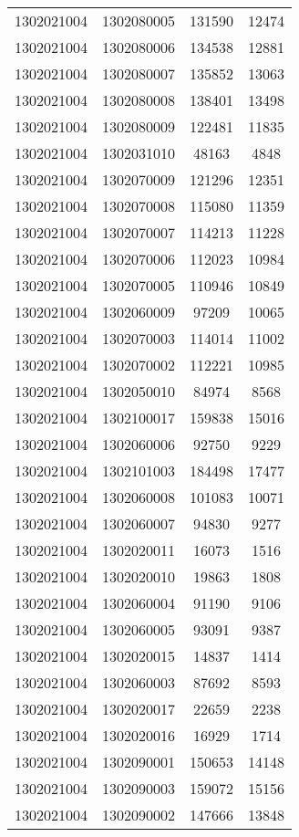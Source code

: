 \begin{longtable}[h]{llcc}
		1302021004 & 1302080005 & 131590 & 12474\\
		1302021004 & 1302080006 & 134538 & 12881\\
		1302021004 & 1302080007 & 135852 & 13063\\
		1302021004 & 1302080008 & 138401 & 13498\\
		1302021004 & 1302080009 & 122481 & 11835\\
		1302021004 & 1302031010 & 48163 & 4848\\
		1302021004 & 1302070009 & 121296 & 12351\\
		1302021004 & 1302070008 & 115080 & 11359\\
		1302021004 & 1302070007 & 114213 & 11228\\
		1302021004 & 1302070006 & 112023 & 10984\\
		1302021004 & 1302070005 & 110946 & 10849\\
		1302021004 & 1302060009 & 97209 & 10065\\
		1302021004 & 1302070003 & 114014 & 11002\\
		1302021004 & 1302070002 & 112221 & 10985\\
		1302021004 & 1302050010 & 84974 & 8568\\
		1302021004 & 1302100017 & 159838 & 15016\\
		1302021004 & 1302060006 & 92750 & 9229\\
		1302021004 & 1302101003 & 184498 & 17477\\
		1302021004 & 1302060008 & 101083 & 10071\\
		1302021004 & 1302060007 & 94830 & 9277\\
		1302021004 & 1302020011 & 16073 & 1516\\
		1302021004 & 1302020010 & 19863 & 1808\\
		1302021004 & 1302060004 & 91190 & 9106\\
		1302021004 & 1302060005 & 93091 & 9387\\
		1302021004 & 1302020015 & 14837 & 1414\\
		1302021004 & 1302060003 & 87692 & 8593\\
		1302021004 & 1302020017 & 22659 & 2238\\
		1302021004 & 1302020016 & 16929 & 1714\\
		1302021004 & 1302090001 & 150653 & 14148\\
		1302021004 & 1302090003 & 159072 & 15156\\
		1302021004 & 1302090002 & 147666 & 13848\\

\end{longtable}
